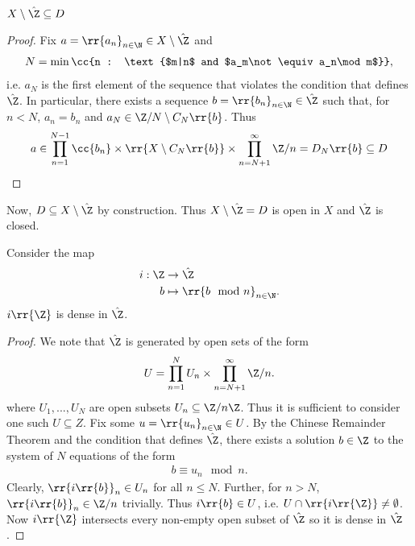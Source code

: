 \documentclass{article}
\begin{document}
\begin{claim*}
  $X\setminus\hat\Z\subseteq D$
  \begin{proof}
    Fix $a=\rr{a_n}_{n\in\N}\in X\setminus\hat\Z$ and
    \begin{align*}
      N=\min\cc{n : \text{$m|n$ and $a_m\not\equiv a_n\mod m$}},
    \end{align*}
    i.e. $a_N$ is the first element of the sequence that violates the condition that defines $\hat\Z$.
    In particular, there exists a sequence $b=\rr{b_n}_{n\in\N}\in\hat\Z$ such that,
    for $n<N$, $a_n=b_n$ and $a_N\in \Z/N\setminus C_N\rr{b}$. Thus
    \begin{align*}
      a\in \prod_{n=1}^{N-1} \cc{b_n} \times \rr{X\setminus C_N\rr{b}} \times \prod_{n=N+1}^\infty \Z/n= D_N\rr{b}\subseteq D
    \end{align*}
  \end{proof}
\end{claim*}
Now, $D\subseteq X\setminus\hat\Z$ by construction. Thus $X\setminus\hat\Z=D$ is open in $X$
and $\hat\Z$ is closed.
\begin{claim*}
  Consider the map
  \begin{align*}
    i:\Z&\to\hat\Z \\
    b&\mapsto  \rr{b \mod n}_{n\in\N}.
  \end{align*}
  $i\rr{\Z}$ is dense in $\hat\Z$.
  \begin{proof}
    We note that $\hat\Z$ is generated by open sets of the form
    \begin{align*}
      U = \prod_{n=1}^{N}U_n \times \prod_{n=N+1}^\infty \Z/n.
    \end{align*}
    where $U_1,...,U_N$ are open subsets $U_n\subseteq \Z/n\Z$.
    Thus it is sufficient to consider one such $U\subseteq Z$.
    Fix some $u=\rr{u_n}_{n\in\N}\in U$. By the Chinese Remainder Theorem and the condition
    that defines $\hat\Z$, there exists a solution $b\in\Z$ to the system of $N$ equations
    of the form
    \begin{align*}
      b \equiv u_n \mod n.
    \end{align*}
    Clearly, $\rr{i\rr{b}}_{n}\in U_n$ for all $n\leq N$. Further, for $n>N$, $\rr{i\rr{b}}_n\in\Z/n$
    trivially. Thus $i\rr{b}\in U$, i.e. $U\cap\rr{i\rr{\Z}}\neq\emptyset$. Now $i\rr{\Z}$ intersects
    every non-empty open subset of $\hat\Z$ so it is dense in $\hat\Z$.
  \end{proof}
\end{claim*}
\end{document}
